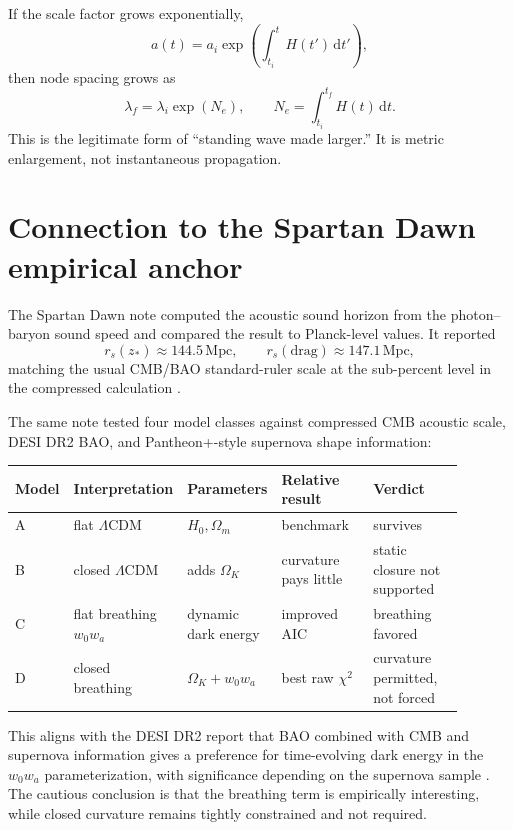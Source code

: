 \documentclass[11pt]{article}
\newcommand{\dd}{\,\mathrm{d}}
\newcommand{\LCDM}{$\Lambda$CDM}
\begin{document}
If the scale factor grows exponentially,
\begin{equation}
 a(t)=a_i\exp\left(\int_{t_i}^{t}H(t')\dd t'\right),
\end{equation}
then node spacing grows as
\begin{equation}
 \lambda_f=\lambda_i\exp(N_e),
 \qquad
 N_e=\int_{t_i}^{t_f}H(t)\dd t.
\end{equation}
This is the legitimate form of ``standing wave made larger.''  It is metric enlargement, not instantaneous propagation.

\section{Connection to the Spartan Dawn empirical anchor}

The Spartan Dawn note computed the acoustic sound horizon from the photon--baryon sound speed and compared the result to Planck-level values.  It reported
\begin{equation}
 r_s(z_*)\approx144.5\,\mathrm{Mpc},
 \qquad
 r_s(\mathrm{drag})\approx147.1\,\mathrm{Mpc},
\end{equation}
matching the usual CMB/BAO standard-ruler scale at the sub-percent level in the compressed calculation \citep{TrawinSpartanDawn2026,Planck2018VI}.

The same note tested four model classes against compressed CMB acoustic scale, DESI DR2 BAO, and Pantheon+-style supernova shape information:
\begin{longtable}{@{}p{0.08\linewidth}p{0.18\linewidth}p{0.19\linewidth}p{0.22\linewidth}p{0.22\linewidth}@{}}
\toprule
Model & Interpretation & Parameters & Relative result & Verdict \\
\midrule
A & flat \LCDM & $H_0,\Omega_m$ & benchmark & survives \\
B & closed \LCDM & adds $\Omega_K$ & curvature pays little & static closure not supported \\
C & flat breathing $w_0w_a$ & dynamic dark energy & improved AIC & breathing favored \\
D & closed breathing & $\Omega_K+w_0w_a$ & best raw $\chi^2$ & curvature permitted, not forced \\
\bottomrule
\end{longtable}

This aligns with the DESI DR2 report that BAO combined with CMB and supernova information gives a preference for time-evolving dark energy in the $w_0w_a$ parameterization, with significance depending on the supernova sample \citep{DESIDR2BAO2025}.  The cautious conclusion is that the breathing term is empirically interesting, while closed curvature remains tightly constrained and not required.
\end{document}
